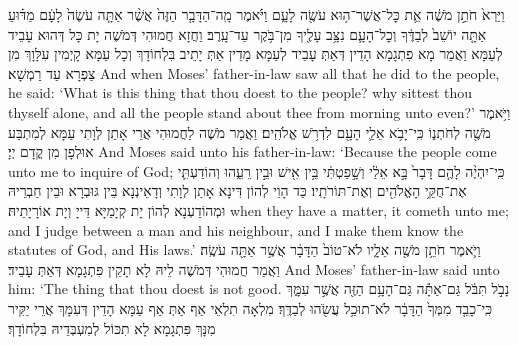 {וַיַּרְא֙ חֹתֵ֣ן מֹשֶׁ֔ה אֵ֛ת כׇּל־אֲשֶׁר־ה֥וּא עֹשֶׂ֖ה לָעָ֑ם וַיֹּ֗אמֶר מָֽה־הַדָּבָ֤ר הַזֶּה֙ אֲשֶׁ֨ר אַתָּ֤ה עֹשֶׂה֙ לָעָ֔ם מַדּ֗וּעַ אַתָּ֤ה יוֹשֵׁב֙ לְבַדֶּ֔ךָ וְכׇל־הָעָ֛ם נִצָּ֥ב עָלֶ֖יךָ מִן־בֹּ֥קֶר עַד־עָֽרֶב׃}
{וַחֲזָא חֲמוּהִי דְּמֹשֶׁה יָת כָּל דְּהוּא עָבֵיד לְעַמָּא וַאֲמַר מָא פִתְגָמָא הָדֵין דְּאַתְּ עָבֵיד לְעַמָּא מָדֵין אַתְּ יָתֵיב בִּלְחוֹדָךְ וְכָל עַמָּא קָיְמִין עִלָּוָךְ מִן צַפְרָא עַד רַמְשָׁא׃}
{And when Moses’ father-in-law saw all that he did to the people, he said: ‘What is this thing that thou doest to the people? why sittest thou thyself alone, and all the people stand about thee from morning unto even?’}{}
{וַיֹּ֥אמֶר מֹשֶׁ֖ה לְחֹתְנ֑וֹ כִּֽי־יָבֹ֥א אֵלַ֛י הָעָ֖ם לִדְרֹ֥שׁ אֱלֹהִֽים׃
}
{וַאֲמַר מֹשֶׁה לַחֲמוּהִי אֲרֵי אָתַן לְוָתִי עַמָּא לְמִתְבַּע אוּלְפָן מִן קֳדָם יְיָ׃}
{And Moses said unto his father-in-law: ‘Because the people come unto me to inquire of God;}{}
{כִּֽי־יִהְיֶ֨ה לָהֶ֤ם דָּבָר֙ בָּ֣א אֵלַ֔י וְשָׁ֣פַטְתִּ֔י בֵּ֥ין אִ֖ישׁ וּבֵ֣ין רֵעֵ֑הוּ וְהוֹדַעְתִּ֛י אֶת־חֻקֵּ֥י הָאֱלֹהִ֖ים וְאֶת־תּוֹרֹתָֽיו׃
}
{כַּד הָוֵי לְהוֹן דִּינָא אָתַן לְוָתִי וְדָאֵינְנָא בֵּין גּוּבְרָא וּבֵין חַבְרֵיהּ וּמְהוֹדַעְנָא לְהוֹן יָת קְיָמַיָּא דַּייָ וְיָת אוֹרָיָתֵיהּ׃}
{when they have a matter, it cometh unto me; and I judge between a man and his neighbour, and I make them know the statutes of God, and His laws.’}{}
{וַיֹּ֛אמֶר חֹתֵ֥ן מֹשֶׁ֖ה אֵלָ֑יו לֹא־טוֹב֙ הַדָּבָ֔ר אֲשֶׁ֥ר אַתָּ֖ה עֹשֶֽׂה׃
}
{וַאֲמַר חֲמוּהִי דְּמֹשֶׁה לֵיהּ לָא תָקֵין פִּתְגָמָא דְּאַתְּ עָבֵיד׃}
{And Moses’ father-in-law said unto him: ‘The thing that thou doest is not good.}{}
{נָבֹ֣ל תִּבֹּ֔ל גַּם־אַתָּ֕ה גַּם־הָעָ֥ם הַזֶּ֖ה אֲשֶׁ֣ר עִמָּ֑ךְ כִּֽי־כָבֵ֤ד מִמְּךָ֙ הַדָּבָ֔ר לֹא־תוּכַ֥ל עֲשֹׂ֖הוּ לְבַדֶּֽךָ׃
}
{מִלְאָה תִלְאֵי אַף אַתְּ אַף עַמָּא הָדֵין דְּעִמָּךְ אֲרֵי יַקִּיר מִנָּךְ פִּתְגָמָא לָא תִכּוֹל לְמִעְבְּדֵיהּ בִּלְחוֹדָךְ׃}
